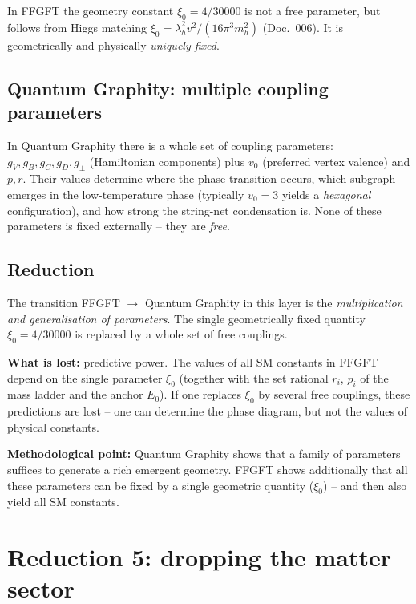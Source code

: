 In FFGFT the geometry constant $\xi_0 = 4/30000$ is not a free
parameter, but follows from Higgs matching
$\xi_0 = \lambda_h^2 v^2/(16\pi^3 m_h^2)$ (Doc.~006). It is
geometrically and physically \emph{uniquely fixed}.

\subsection{Quantum Graphity: multiple coupling parameters}

In Quantum Graphity there is a whole set of coupling parameters:
$g_V, g_B, g_C, g_D, g_\pm$ (Hamiltonian components) plus $v_0$
(preferred vertex valence) and $p, r$. Their values determine where
the phase transition occurs, which subgraph emerges in the
low-temperature phase (typically $v_0 = 3$ yields a \emph{hexagonal}
configuration), and how strong the string-net condensation is.
None of these parameters is fixed externally -- they are \emph{free}.

\subsection{Reduction}

The transition FFGFT $\to$ Quantum Graphity in this layer is the
\emph{multiplication and generalisation of parameters}. The single
geometrically fixed quantity $\xi_0 = 4/30000$ is replaced by a
whole set of free couplings.

\textbf{What is lost:} predictive power. The values of all SM
constants in FFGFT depend on the single parameter $\xi_0$ (together
with the set rational $r_i$, $p_i$ of the mass ladder and the anchor
$E_0$). If
one replaces $\xi_0$ by several free couplings, these predictions
are lost -- one can determine the phase diagram, but not the values
of physical constants.

\textbf{Methodological point:} Quantum Graphity shows that a family
of parameters suffices to generate a rich emergent geometry. FFGFT
shows additionally that all these parameters can be fixed by a
single geometric quantity ($\xi_0$) -- and then also yield all SM
constants.

\section{Reduction 5: dropping the matter sector}


